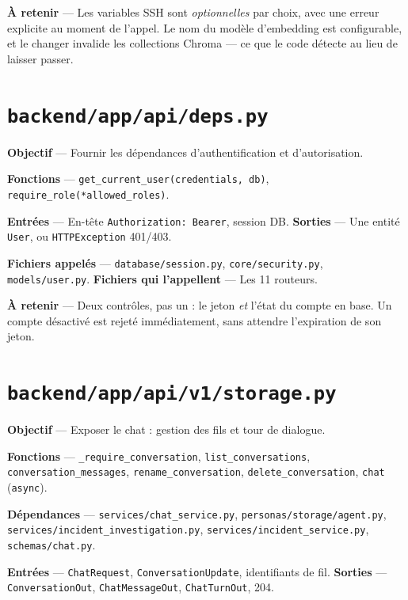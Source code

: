 \documentclass[11pt,a4paper]{report}
\newcommand{\file}[1]{\texttt{\small #1}}
\newcommand{\fn}[1]{\texttt{\small\textcolor{oasisviolet}{#1}}}
\newcommand{\cls}[1]{\texttt{\small\textcolor{oasisblue}{#1}}}
\begin{document}
\textbf{À retenir} --- Les variables SSH sont \emph{optionnelles} par choix, avec
une erreur explicite au moment de l'appel. Le nom du modèle d'embedding est
configurable, et le changer invalide les collections Chroma --- ce que le code
détecte au lieu de laisser passer.

\section{\file{backend/app/api/deps.py}}

\textbf{Objectif} --- Fournir les dépendances d'authentification et
d'autorisation.

\textbf{Fonctions} --- \fn{get\_current\_user(credentials, db)},
\fn{require\_role(*allowed\_roles)}.

\textbf{Entrées} --- En-tête \texttt{Authorization: Bearer}, session DB.
\textbf{Sorties} --- Une entité \cls{User}, ou \cls{HTTPException} 401/403.

\textbf{Fichiers appelés} --- \file{database/session.py},
\file{core/security.py}, \file{models/user.py}.
\textbf{Fichiers qui l'appellent} --- Les 11 routeurs.

\textbf{À retenir} --- Deux contrôles, pas un : le jeton \emph{et} l'état du
compte en base. Un compte désactivé est rejeté immédiatement, sans attendre
l'expiration de son jeton.

\section{\file{backend/app/api/v1/storage.py}}

\textbf{Objectif} --- Exposer le chat : gestion des fils et tour de dialogue.

\textbf{Fonctions} --- \fn{\_require\_conversation}, \fn{list\_conversations},
\fn{conversation\_messages}, \fn{rename\_conversation},
\fn{delete\_conversation}, \fn{chat} (\texttt{async}).

\textbf{Dépendances} --- \file{services/chat\_service.py},
\file{personas/storage/agent.py}, \file{services/incident\_investigation.py},
\file{services/incident\_service.py}, \file{schemas/chat.py}.

\textbf{Entrées} --- \cls{ChatRequest}, \cls{ConversationUpdate}, identifiants de
fil. \textbf{Sorties} --- \cls{ConversationOut}, \cls{ChatMessageOut},
\cls{ChatTurnOut}, 204.
\end{document}
